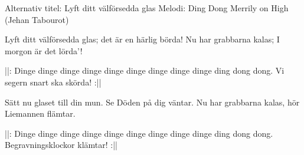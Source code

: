 \begin{song}

\begin{songmeta}
Alternativ titel: Lyft ditt välförsedda glas  
Melodi: Ding Dong Merrily on High (Jehan Tabourot)
\end{songmeta}

\begin{songtext}
Lyft ditt välförsedda glas;
det är en härlig börda!
Nu har grabbarna kalas;
I morgon är det lörda'!

||: Dinge dinge dinge
dinge dinge dinge
dinge dinge dinge ding dong dong.
Vi segern snart ska skörda! :||

Sätt nu glaset till din mun.
Se Döden på dig väntar.
Nu har grabbarna kalas,
hör Liemannen flämtar.

||: Dinge dinge dinge
dinge dinge dinge
dinge dinge dinge ding dong dong.
Begravningsklockor klämtar! :||
\end{songtext}

\begin{songnotes}
\end{songnotes}

\end{song}
